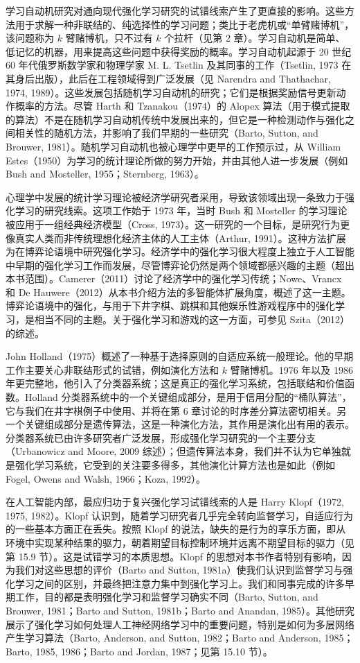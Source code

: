 \documentclass[UTF8,12pt,a4paper,fontset=fandol]{ctexart}
\begin{document}
学习自动机研究对通向现代强化学习研究的试错线索产生了更直接的影响。这些方法用于求解一种非联结的、纯选择性的学习问题；类比于老虎机或“单臂赌博机”，该问题称为 $k$ 臂赌博机，只不过有 $k$ 个拉杆（见第 2 章）。学习自动机是简单、低记忆的机器，用来提高这些问题中获得奖励的概率。学习自动机起源于 20 世纪 60 年代俄罗斯数学家和物理学家 M. L. Tsetlin 及其同事的工作（Tsetlin, 1973 在其身后出版），此后在工程领域得到广泛发展（见 Narendra and Thathachar, 1974, 1989）。这些发展包括随机学习自动机的研究；它们是根据奖励信号更新动作概率的方法。尽管 Harth 和 Tzanakou（1974）的 Alopex 算法（用于模式提取的算法）不是在随机学习自动机传统中发展出来的，但它是一种检测动作与强化之间相关性的随机方法，并影响了我们早期的一些研究（Barto, Sutton, and Brouwer, 1981）。随机学习自动机也被心理学中更早的工作预示过，从 William Estes（1950）为学习的统计理论所做的努力开始，并由其他人进一步发展（例如 Bush and Mosteller, 1955；Sternberg, 1963）。

心理学中发展的统计学习理论被经济学研究者采用，导致该领域出现一条致力于强化学习的研究线索。这项工作始于 1973 年，当时 Bush 和 Mosteller 的学习理论被应用于一组经典经济模型（Cross, 1973）。这一研究的一个目标，是研究行为更像真实人类而非传统理想化经济主体的人工主体（Arthur, 1991）。这种方法扩展为在博弈论语境中研究强化学习。经济学中的强化学习很大程度上独立于人工智能中早期的强化学习工作而发展，尽管博弈论仍然是两个领域都感兴趣的主题（超出本书范围）。Camerer（2011）讨论了经济学中的强化学习传统；Nowe、Vrancx 和 De Hauwere（2012）从本书介绍方法的多智能体扩展角度，概述了这一主题。博弈论语境中的强化，与用于下井字棋、跳棋和其他娱乐性游戏程序中的强化学习，是相当不同的主题。关于强化学习和游戏的这一方面，可参见 Szita（2012）的综述。

John Holland（1975）概述了一种基于选择原则的自适应系统一般理论。他的早期工作主要关心非联结形式的试错，例如演化方法和 $k$ 臂赌博机。1976 年以及 1986 年更完整地，他引入了分类器系统；这是真正的强化学习系统，包括联结和价值函数。Holland 分类器系统中的一个关键组成部分，是用于信用分配的“桶队算法”，它与我们在井字棋例子中使用、并将在第 6 章讨论的时序差分算法密切相关。另一个关键组成部分是遗传算法，这是一种演化方法，其作用是演化出有用的表示。分类器系统已由许多研究者广泛发展，形成强化学习研究的一个主要分支（Urbanowicz and Moore, 2009 综述）；但遗传算法本身，我们并不认为它单独就是强化学习系统，它受到的关注要多得多，其他演化计算方法也是如此（例如 Fogel, Owens and Walsh, 1966；Koza, 1992）。

在人工智能内部，最应归功于复兴强化学习试错线索的人是 Harry Klopf（1972, 1975, 1982）。Klopf 认识到，随着学习研究者几乎完全转向监督学习，自适应行为的一些基本方面正在丢失。按照 Klopf 的说法，缺失的是行为的享乐方面，即从环境中实现某种结果的驱力，朝着期望目标控制环境并远离不期望目标的驱力（见第 15.9 节）。这是试错学习的本质思想。Klopf 的思想对本书作者特别有影响，因为我们对这些思想的评价（Barto and Sutton, 1981a）使我们认识到监督学习与强化学习之间的区别，并最终把注意力集中到强化学习上。我们和同事完成的许多早期工作，目的都是表明强化学习和监督学习确实不同（Barto, Sutton, and Brouwer, 1981；Barto and Sutton, 1981b；Barto and Anandan, 1985）。其他研究展示了强化学习如何处理人工神经网络学习中的重要问题，特别是如何为多层网络产生学习算法（Barto, Anderson, and Sutton, 1982；Barto and Anderson, 1985；Barto, 1985, 1986；Barto and Jordan, 1987；见第 15.10 节）。
\end{document}
